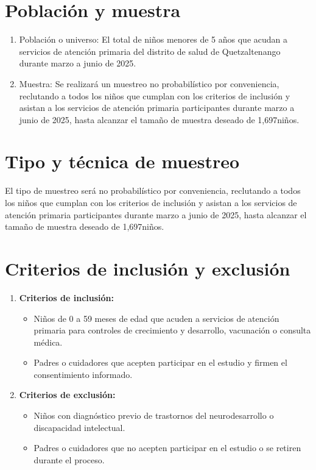 \documentclass[11pt,letterpaper]{report}
\newcommand{\tiempito}{marzo a junio de 2025}
\newcommand{\muestradeseada}{1,697}
\begin{document}
\section{Población y muestra}

\begin{enumerate}
	\item Población o universo:
		El total de niños menores de 5 años que acudan a servicios de atención
		primaria del distrito de salud de Quetzaltenango durante \tiempito.
	\item Muestra:
		Se realizará un muestreo no probabilístico por conveniencia, reclutando
		a todos los niños que cumplan con los criterios de inclusión y asistan
		a los servicios de atención primaria participantes durante \tiempito,
		hasta alcanzar el tamaño de muestra deseado de \muestradeseada niños.
\end{enumerate}

\section{Tipo y técnica de muestreo}
El tipo de muestreo será no probabilístico por conveniencia, reclutando a todos
los niños que cumplan con los criterios de inclusión y asistan a los servicios
de atención primaria participantes durante \tiempito, hasta alcanzar el tamaño
de muestra deseado de \muestradeseada niños.

\section{Criterios de inclusión y exclusión}
\begin{enumerate}
	\item \textbf{Criterios de inclusión:}
		\begin{itemize}
		\item Niños de 0 a 59 meses de edad que acuden a servicios de atención
		primaria para controles de crecimiento y desarrollo, vacunación o
		consulta médica.
		\item Padres o cuidadores que acepten participar en el estudio y firmen
		el consentimiento informado. 
		\end{itemize}
	\item \textbf{Criterios de exclusión:}
		\begin{itemize}
		\item Niños con diagnóstico previo de trastornos del neurodesarrollo o
		discapacidad intelectual. 
		\item Padres o cuidadores que no acepten participar en el estudio o se
		retiren durante el proceso.
		\end{itemize}
\end{enumerate}
\end{document}
